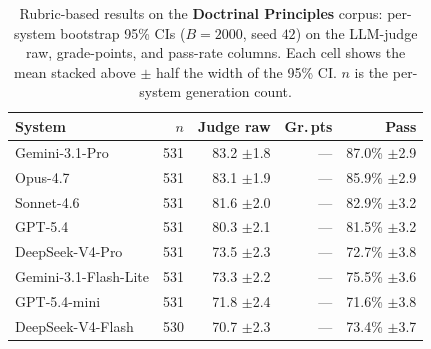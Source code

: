 \begin{table}[t]
\centering\footnotesize
\caption{Rubric-based results on the \textbf{Doctrinal Principles} corpus: per-system bootstrap 95\% CIs ($B=2000$, seed $42$) on the LLM-judge raw, grade-points, and pass-rate columns. Each cell shows the mean stacked above $\pm$ half the width of the 95\% CI. $n$ is the per-system generation count.}
\label{tbl-full-results-rubric-grundpr}
\setlength{\tabcolsep}{4pt}
\begin{tabular*}{\textwidth}{@{\extracolsep{\fill}}lrrrr@{}}
\toprule
System & $n$ & Judge raw & Gr.\,pts & Pass \\
\midrule
Gemini-3.1-Pro & 531 & \shortstack[r]{83.2\\{\scriptsize $\pm$1.8}} & --- & \shortstack[r]{87.0\%\\{\scriptsize $\pm$2.9}} \\
Opus-4.7 & 531 & \shortstack[r]{83.1\\{\scriptsize $\pm$1.9}} & --- & \shortstack[r]{85.9\%\\{\scriptsize $\pm$2.9}} \\
Sonnet-4.6 & 531 & \shortstack[r]{81.6\\{\scriptsize $\pm$2.0}} & --- & \shortstack[r]{82.9\%\\{\scriptsize $\pm$3.2}} \\
GPT-5.4 & 531 & \shortstack[r]{80.3\\{\scriptsize $\pm$2.1}} & --- & \shortstack[r]{81.5\%\\{\scriptsize $\pm$3.2}} \\
DeepSeek-V4-Pro & 531 & \shortstack[r]{73.5\\{\scriptsize $\pm$2.3}} & --- & \shortstack[r]{72.7\%\\{\scriptsize $\pm$3.8}} \\
Gemini-3.1-Flash-Lite & 531 & \shortstack[r]{73.3\\{\scriptsize $\pm$2.2}} & --- & \shortstack[r]{75.5\%\\{\scriptsize $\pm$3.6}} \\
GPT-5.4-mini & 531 & \shortstack[r]{71.8\\{\scriptsize $\pm$2.4}} & --- & \shortstack[r]{71.6\%\\{\scriptsize $\pm$3.8}} \\
DeepSeek-V4-Flash & 530 & \shortstack[r]{70.7\\{\scriptsize $\pm$2.3}} & --- & \shortstack[r]{73.4\%\\{\scriptsize $\pm$3.7}} \\

\end{tabular*}
\end{table}
